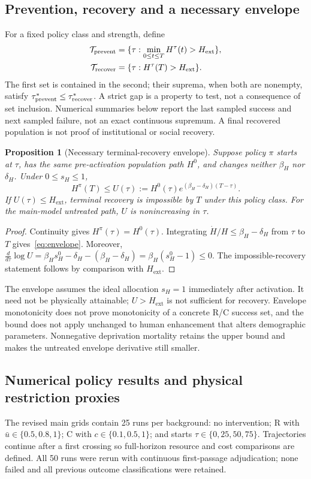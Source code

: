 \documentclass[12pt,a4paper]{article}
\newtheorem{proposition}{Proposition}[section]
\theoremstyle{remark}
\newcommand{\Hext}{H_{\mathrm{ext}}}
\begin{document}
\subsection{Prevention, recovery and a necessary envelope}
For a fixed policy class and strength, define
\begin{align}
\mathcal T_{\rm prevent}&=\{\tau:\min_{0\le t\le T}H^\tau(t)>\Hext\},\\
\mathcal T_{\rm recover}&=\{\tau:H^\tau(T)>\Hext\}.\label{eq:timingsets}
\end{align}
The first set is contained in the second; their suprema, when both are nonempty, satisfy $\tau^*_{\rm prevent}\le\tau^*_{\rm recover}$. A strict gap is a property to test, not a consequence of set inclusion. Numerical summaries below report the last sampled success and next sampled failure, not an exact continuous supremum. A final recovered population is not proof of institutional or social recovery.

\begin{proposition}[Necessary terminal-recovery envelope]\label{prop:envelope}
Suppose policy $\pi$ starts at $\tau$, has the same pre-activation population path $H^0$, and changes neither $\beta_H$ nor $\delta_H$. Under $0\le s_H\le1$,
\begin{equation}\label{eq:envelope}
H^\pi(T)\le U(\tau):=H^0(\tau)e^{(\beta_H-\delta_H)(T-\tau)}.
\end{equation}
If $U(\tau)\le\Hext$, terminal recovery is impossible by $T$ under this policy class. For the main-model untreated path, $U$ is nonincreasing in $\tau$.
\end{proposition}
\begin{proof}
Continuity gives $H^\pi(\tau)=H^0(\tau)$. Integrating $\dot H/H\le\beta_H-\delta_H$ from $\tau$ to $T$ gives~\eqref{eq:envelope}. Moreover,
$\frac{d}{d\tau}\log U=\beta_Hs_H^0-\delta_H-(\beta_H-\delta_H)=\beta_H(s_H^0-1)\le0$.
The impossible-recovery statement follows by comparison with $\Hext$.
\end{proof}
The envelope assumes the ideal allocation $s_H=1$ immediately after activation. It need not be physically attainable; $U>\Hext$ is not sufficient for recovery. Envelope monotonicity does not prove monotonicity of a concrete R/C success set, and the bound does not apply unchanged to human enhancement that alters demographic parameters. Nonnegative deprivation mortality retains the upper bound and makes the untreated envelope derivative still smaller.

\subsection{Numerical policy results and physical restriction proxies}
The revised main grids contain 25 runs per background: no intervention; R with $\bar u\in\{0.5,0.8,1\}$; C with $c\in\{0.1,0.5,1\}$; and starts $\tau\in\{0,25,50,75\}$. Trajectories continue after a first crossing so full-horizon resource and cost comparisons are defined. All 50 runs were rerun with continuous first-passage adjudication; none failed and all previous outcome classifications were retained.
\end{document}
